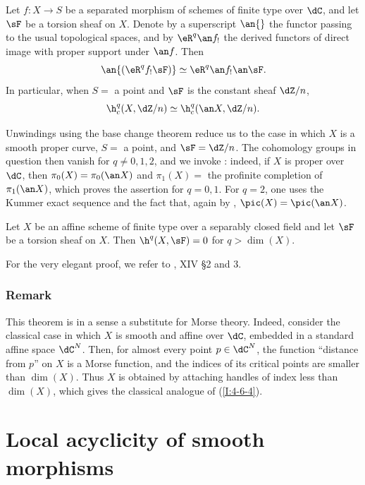 \begin{theorem}\label{I:4-6-3}
Let $f:X\to S$ be a separated morphism of schemes of finite type over
$\dC$, and let $\sF$ be a torsion sheaf on $X$. Denote by a superscript
$\an{}$ the functor passing to the usual topological spaces, and by
$\eR^q\an f_!$ the derived functors of direct image with proper support
under $\an f$. Then
\[
  \an{(\eR^q f_! \sF)} \simeq \eR^q \an f_! \an \sF \text{.}
\]
In particular, when $S=$ a point and $\sF$ is the constant sheaf
$\dZ/n$,
\[
  \h_c^q(X,\dZ/n) \simeq \h_c^q(\an X,\dZ/n)\text{.}
\]
\end{theorem}

Unwindings using the base change theorem reduce us to the case in which
$X$ is a smooth proper curve, $S=$ a point, and $\sF=\dZ/n$. The
cohomology groups in question then vanish for $q\ne0,1,2$, and we invoke
: indeed, if $X$ is proper over $\dC$, then
$\pi_0(X)=\pi_0(\an X)$ and $\pi_1(X)=$ the profinite completion of
$\pi_1(\an X)$, which proves the assertion for $q=0,1$. For $q=2$,
one uses the Kummer exact sequence and the fact that, again by
, $\pic(X)=\pic(\an X)$.

\begin{theorem}\label{I:4-6-4}
Let $X$ be an affine scheme of finite type over a separably closed field
and let $\sF$ be a torsion sheaf on $X$. Then
$\h^q(X,\sF)=0$ for $q>\dim(X)$.
\end{theorem}

For the very elegant proof, we refer to , XIV \S 2 and 3.

\subsubsection{Remark}\label{I:4-6-5}

This theorem is in a sense a substitute for Morse theory. Indeed, consider
the classical case in which $X$ is smooth and affine over $\dC$, embedded
in a standard affine space $\dC^N$. Then, for almost every point
$p\in\dC^N$, the function “distance from $p$” on $X$ is a Morse
function, and the indices of its critical points are smaller than
$\dim(X)$. Thus $X$ is obtained by attaching handles of index less than
$\dim(X)$, which gives the classical analogue of (\ref{I:4-6-4}).

\section{Local acyclicity of smooth morphisms}\label{I:5}

